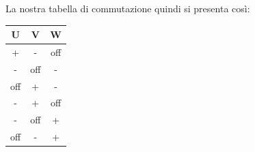 \documentclass[a4paper]{report}
\begin{document}
    La nostra tabella di commutazione quindi si presenta così:
    \begin{table}[htbp]
        \centering
            \begin{tabular}{|c|c|c|}
                \hline
                U & V & W \\\hline
                + & - & off\\ \hline
                - & off & - \\ \hline
                off & + & - \\ \hline
                - & + & off \\ \hline
                - & off & + \\ \hline
                off & - & + \\ \hline
            \end{tabular}
            \label{tab:tabella di commutazione}
    \end{table}
\end{document}
